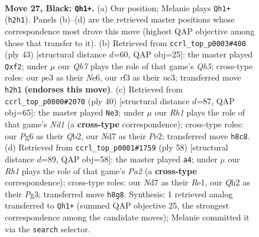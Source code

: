 \documentclass[11pt]{article}
\begin{document}
\clearpage

\begin{figure}[p]\centering
\begin{subfigure}{0.46\textwidth}\centering
\resizebox{\linewidth}{!}{%
\newchessgame
\chessboard[
  setfen={r6r/3nk2p/1pp1p1p1/8/1p1P3P/P3PRb1/RP4Nq/2BQ1K2 b - - 6 27},
  showmover=false,
  pgfstyle=straightmove, color=movearrow, markmove={h2-h1}
]}
\caption{}
\end{subfigure}\hfill
\begin{subfigure}{0.46\textwidth}\centering
\resizebox{\linewidth}{!}{%
\newchessgame
\chessboard[
  setfen={r4rk1/pp5p/3pn1p1/8/2P1PPbq/2N5/PP3Q1P/R1B2R1K b - - 6 22},
  showmover=false,
  pgfstyle=straightmove, color=movearrow, markmove={h4-f2}
]}
\caption{}
\end{subfigure}
\\[4pt]
\begin{subfigure}{0.46\textwidth}\centering
\resizebox{\linewidth}{!}{%
\newchessgame
\chessboard[
  setfen={1nr2r1k/3bq1pp/2p5/p2Ppp2/8/P5P1/1Q2P1BP/2RN1RK1 w - - 0 21},
  showmover=false,
  pgfstyle=straightmove, color=movearrow, markmove={d1-e3}
]}
\caption{}
\end{subfigure}\hfill
\begin{subfigure}{0.46\textwidth}\centering
\resizebox{\linewidth}{!}{%
\newchessgame
\chessboard[
  setfen={7k/Q1b2qp1/3Br2p/1r2pp2/2Np1n2/3P2P1/P6P/R3R1K1 w - - 0 30},
  showmover=false,
  pgfstyle=straightmove, color=movearrow, markmove={a2-a4}
]}
\caption{}
\end{subfigure}
\caption{\textbf{Move 27, Black: \texttt{Qh1+}.} (a) Our position; Melanie plays \texttt{Qh1+} (\texttt{h2h1}). Panels (b)--(d) are the retrieved master positions whose correspondence most drove this move (highest QAP objective among those that transfer to it). (b) Retrieved from \texttt{ccrl\_top\_p0003\#400} (ply 43) [structural distance $d$=60, QAP obj=25]: the master played \texttt{Qxf2}; under $\mu$ our \emph{Qh7} plays the role of that game's \emph{Qh5}; cross-type roles: our \emph{p}e3 as their \emph{N}e6, our \emph{r}f3 as their \emph{n}c3; transferred move \texttt{h2h1} \textbf{(endorses this move)}. (c) Retrieved from \texttt{ccrl\_top\_p0000\#2070} (ply 40) [structural distance $d$=87, QAP obj=65]: the master played \texttt{Ne3}; under $\mu$ our \emph{Rh1} plays the role of that game's \emph{Nd1} (a \textbf{cross-type} correspondence); cross-type roles: our \emph{P}g6 as their \emph{Q}b2, our \emph{N}d7 as their \emph{P}e2; transferred move \texttt{h8c8}. (d) Retrieved from \texttt{ccrl\_top\_p0001\#1759} (ply 58) [structural distance $d$=89, QAP obj=58]: the master played \texttt{a4}; under $\mu$ our \emph{Rh1} plays the role of that game's \emph{Pa2} (a \textbf{cross-type} correspondence); cross-type roles: our \emph{N}d7 as their \emph{R}e1, our \emph{Q}h2 as their \emph{P}g3; transferred move \texttt{h8g8}. Synthesis: 1 retrieved analog transferred to \texttt{Qh1+} (summed QAP objective 25, the strongest correspondence among the candidate moves); Melanie committed it via the \texttt{search} selector.}
\label{fig:thought-m53}
\end{figure}
\end{document}
